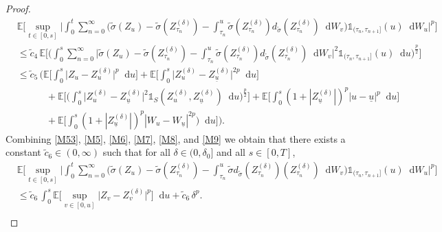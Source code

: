 \documentclass[11pt,a4paper]{article}
\numberwithin{equation}{section}
\theoremstyle{definition}
\newcommand{\E}{{\mathbb{E}}}
\newcommand{\diff}{\mathop{}\!\mathrm{d}}
\begin{document}
\begin{proof}
\begin{equation}\label{M53}
    \begin{aligned}
    &\E\Big[\sup_{t\in[0,s]} \Big| \int_0^t \sum_{n=0}^{\infty} \Big(\widetilde\sigma(Z_u) -\widetilde\sigma(Z^{(\delta)}_{\tau_n}) - \int_{\tau_n}^u \widetilde\sigma(Z^{(\delta)}_{\tau_n}) d_{\widetilde\sigma} (Z^{(\delta)}_{\tau_n}) \diff W_v \Big)\mathds{1}_{(\tau_n,\tau_{n+1}]}(u) \diff W_u\Big|^p\Big]\\
    &\leq \widetilde c_4 \, \E\Big[\Big( \int_0^s \sum_{n=0}^{\infty} \Big|\widetilde\sigma(Z_u) -\widetilde\sigma(Z^{(\delta)}_{\tau_n}) - \int_{\tau_n}^u \widetilde\sigma(Z^{(\delta)}_{\tau_n}) d_{\widetilde\sigma} (Z^{(\delta)}_{\tau_n}) \diff W_v \Big|^2\mathds{1}_{(\tau_n,\tau_{n+1}]}(u) \diff u\Big)^{\frac{p}{2}}\Big]\\
    &\leq \widetilde c_{5}\, \Big( \E\Big[ \int_0^s  \big|Z_{u} - Z^{(\delta)}_{u}\big|^p \diff u \Big]
    + \E\Big[ \int_0^s  \big|Z^{(\delta)}_{u} - Z^{(\delta)}_{\underline u} \big|^{2p} \diff u\Big] \\
    &\quad\quad\quad +\E\Big[\Big( \int_0^s \big|Z^{(\delta)}_{u} - Z^{(\delta)}_{\underline u}\big|^2\mathds{1}_{S}(Z^{(\delta)}_{u},Z^{(\delta)}_{\underline u}) \diff u\Big)^{\frac{p}{2}}\Big]
    + \E\Big[ \int_0^s (1+|Z^{(\delta)}_{\underline u}|)^p |u-\underline u|^p \diff u\Big]\\
    &\quad\quad\quad +\E\Big[ \int_0^s  (1+|Z^{(\delta)}_{\underline u}|)^p |W_u-W_{\underline u}|^{2p}\Big) \diff u\Big]\Big).
    \end{aligned}
\end{equation}
Combining \eqref{M53}, \eqref{M5}, \eqref{M6}, \eqref{M7}, \eqref{M8}, and \eqref{M9} we obtain that there exists a constant $\widetilde c_{6}\in(0,\infty)$ such that for all $\delta\in(0,\delta_0]$ and all $s\in[0,T]$,
\begin{equation}\label{M59}
    \begin{aligned}
    &\E\Big[\sup_{t\in[0,s]} \Big| \int_0^t \sum_{n=0}^{\infty} \Big(\widetilde\sigma(Z_u) -\widetilde\sigma(Z^{(\delta)}_{\tau_n}) - \int_{\tau_n}^u \widetilde\sigma d_{\widetilde\sigma}(Z^{(\delta)}_{\tau_n}) (Z^{(\delta)}_{\tau_n}) \diff W_v \Big)\mathds{1}_{(\tau_n,\tau_{n+1}]}(u) \diff W_u\Big|^p\Big]\\
    &\leq \widetilde c_{6}\, \int_0^s \E\Big[ \sup_{v\in[0,u]} \big|Z_{v} - Z^{(\delta)}_{v}\big|^p\Big]  \diff u 
    + \widetilde c_{6}\,  \delta^{p}.\\
    \end{aligned}

\end{equation}
\end{proof}
\end{document}
